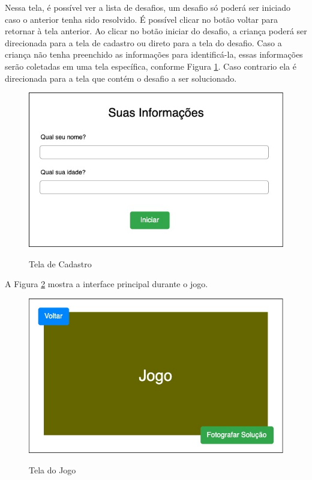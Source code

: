     Nessa tela, é possível ver a lista de desafios, um desafio só poderá ser iniciado caso o anterior tenha sido resolvido.
    É possível clicar no botão voltar para retornar à tela anterior.
    Ao clicar no botão iniciar do desafio, a criança poderá ser direcionada para a tela de cadastro ou direto para a tela do desafio.
    Caso a criança não tenha preenchido as informações para identificá-la, essas informações serão coletadas em uma tela específica, conforme Figura \ref{figura:cadastro}. Caso contrario ela é direcionada para a tela que contém o desafio a ser solucionado.
    
    \begin{figure}[H]
        \caption{Tela de Cadastro}
        \centering
        \includegraphics[width=\linewidth]{Imagens/Cap3/informacoes_usuario.jpg}
        \label{figura:cadastro}
    \end{figure}
    
    A Figura \ref{figura:tela_jogo} mostra a interface principal durante o jogo.
    
    \begin{figure}[H]
        \caption{Tela do Jogo}
        \centering
        \includegraphics[width=\linewidth]{Imagens/Cap3/tela_jogo.jpg}
        \label{figura:tela_jogo}
    \end{figure}
    
